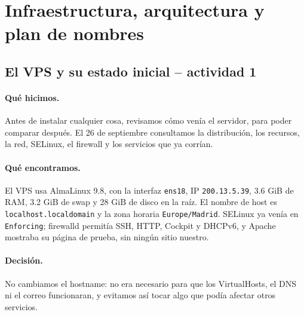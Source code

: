 \documentclass[11pt,a4paper]{article}
\begin{document}
\section{Infraestructura, arquitectura y plan de nombres}
\subsection{El VPS y su estado inicial -- actividad 1}
\paragraph{Qué hicimos.} Antes de instalar cualquier cosa, revisamos cómo venía el servidor, para poder comparar después. El 26 de septiembre consultamos la distribución, los recursos, la red, SELinux, el firewall y los servicios que ya corrían.

\paragraph{Qué encontramos.} El VPS usa AlmaLinux 9.8, con la interfaz \texttt{ens18}, IP \texttt{200.13.5.39}, 3.6 GiB de RAM, 3.2 GiB de swap y 28 GiB de disco en la raíz. El nombre de host es \texttt{localhost.localdomain} y la zona horaria \texttt{Europe/Madrid}. SELinux ya venía en \texttt{Enforcing}; firewalld permitía SSH, HTTP, Cockpit y DHCPv6, y Apache mostraba su página de prueba, sin ningún sitio nuestro.

\paragraph{Decisión.} No cambiamos el hostname: no era necesario para que los VirtualHosts, el DNS ni el correo funcionaran, y evitamos así tocar algo que podía afectar otros servicios.
\end{document}
